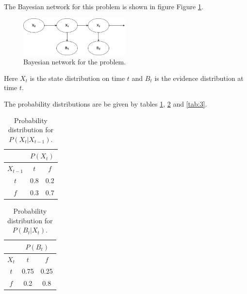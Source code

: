 \documentclass[11pt, a4paper, english]{NTNUoving}
\begin{document}
\begin{oppgave}

\begin{punkt}

The Bayesian network for this problem is shown in figure Figure \ref{fig:1}.

\begin{figure}[h]
    \centering
    \includegraphics[width=0.5\textwidth]{BN1.png}
    \caption{Bayesian network for the problem.}
    \label{fig:1}
\end{figure}

Here $X_t$ is the state distribution on time $t$ and $B_t$ is the evidence distribution at time $t$.

The probability distributions are be given by tables \ref{tab:1}, \ref{tab:2} and \ref{tab:3}.

\begin{table}[H]
    \centering
    \begin{tabular}{|c|c|c|}
        \hline
       & \multicolumn{2}{|c|}{$P(X_t)$} \\ [0.5ex]
        \hline
        $X_{t-1}$ & $t$ & $f$ \\
        \hline
        $t$ & 0.8 & 0.2 \\ [1.0ex]
        $f$ & 0.3 & 0.7\\ [1.0ex]
        \hline
\end{tabular}
    \caption{Probability distribution for $P(X_t | X_{t-1})$.}
    \label{tab:1}
\end{table}

\begin{table}[H]
    \centering
    \begin{tabular}{|c|c|c|}
        \hline
       & \multicolumn{2}{|c|}{$P(B_t)$} \\ [0.5ex]
        \hline
        $X_t$ & $t$ & $f$ \\
        \hline
        $t$ & 0.75 & 0.25 \\ [1.0ex]
        $f$ & 0.2 & 0.8\\ [1.0ex]
        \hline
\end{tabular}
    \caption{Probability distribution for $P(B_t | X_t)$.}
    \label{tab:2}
\end{table}


\end{punkt}
\end{oppgave}
\end{document}
